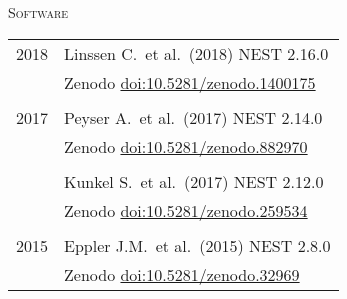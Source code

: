 \textsc{Software}
\begin{longtable}{>{\hfill}p{1.6cm} p{}}
  2018 & Linssen C.~et al.~(2018) NEST 2.16.0 \\
       & \footnotesize Zenodo \href{https://doi.org/10.5281/zenodo.1400175}{doi:10.5281/zenodo.1400175} \\
  \multicolumn{2}{c}{} \\
  2017 & Peyser A.~et al.~(2017) NEST 2.14.0 \\
       & \footnotesize Zenodo \href{https://doi.org/10.5281/zenodo.882970}{doi:10.5281/zenodo.882970} \\
  \multicolumn{2}{c}{} \\
  & Kunkel S.~et al.~(2017) NEST 2.12.0 \\
       & \footnotesize Zenodo \href{http://dx.doi.org/10.5281/zenodo.259534}{doi:10.5281/zenodo.259534} \\
  \multicolumn{2}{c}{} \\
  2015 & Eppler J.M.~et al.~(2015) NEST 2.8.0 \\
       & \footnotesize Zenodo \href{http://dx.doi.org/10.5281/zenodo.32969}{doi:10.5281/zenodo.32969}
\end{longtable}


